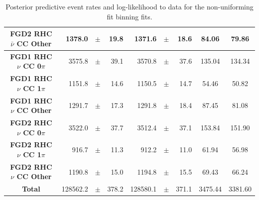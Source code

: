 \begin{center}
\begin{table}
\begin{adjustbox}{max width=1.1\textwidth,center}
\begin{tabular}{S||
                r
                p{0.26cm}
                r
                |r
                p{0.26cm}
                r
                |c
                c}
\textbf{FGD2 RHC $\bar{\nu}$ CC Other} & 1378.0 & $\pm$ & 19.8 & 1371.6 & $\pm$ & 18.6 & 84.06 & 79.86 \\ \hline
\textbf{FGD1 RHC $\nu$ CC 0$\pi$} & 3575.8 & $\pm$ & 39.1 & 3570.8 & $\pm$ & 37.6 & 135.04 & 134.34 \\
\textbf{FGD1 RHC $\nu$ CC 1$\pi$} & 1151.8 & $\pm$ & 14.6 & 1150.5 & $\pm$ & 14.7 & 54.46 & 50.82 \\
\textbf{FGD1 RHC $\nu$ CC Other} & 1291.7 & $\pm$ & 17.3 & 1291.8 & $\pm$ & 18.4 & 87.45 & 81.08 \\ \hline
\textbf{FGD2 RHC $\nu$ CC 0$\pi$} & 3522.0 & $\pm$ & 37.7 & 3512.4 & $\pm$ & 37.1 & 153.84 & 151.90 \\
\textbf{FGD2 RHC $\nu$ CC 1$\pi$} & 916.7 & $\pm$ & 11.3 & 912.2 & $\pm$ & 11.0 & 61.94 & 56.98 \\
\textbf{FGD2 RHC $\nu$ CC Other} & 1190.8 & $\pm$ & 15.0 & 1194.8 & $\pm$ & 15.5 & 69.43 & 66.24 \\ \hline
\textbf{Total} & 128562.2 & $\pm$ & 378.2 & 128580.1 & $\pm$ & 371.1 & 3475.44 & 3381.60 \\ \hline\hline
\end{tabular}
\end{adjustbox}
\caption{Posterior predictive event rates and log-likelihood to data for the non-uniforming fit binning fits.}
\label{tab:polyrates}
\end{table}
\end{center}

